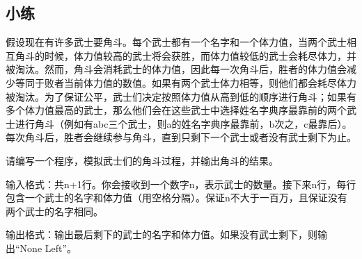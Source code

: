 \documentclass[../main.tex]{subfiles}
\begin{document}
\subsection{小练}

\begin{example}
  假设现在有许多武士要角斗。每个武士都有一个名字和一个体力值，当两个武士相互角斗的时候，体力值较高的武士将会获胜，而体力值较低的武士会耗尽体力，并被淘汰。然而，角斗会消耗武士的体力值，因此每一次角斗后，胜者的体力值会减少等同于败者当前体力值的数值。如果有两个武士体力相等，则他们都会耗尽体力被淘汰。为了保证公平，武士们决定按照体力值从高到低的顺序进行角斗；如果有多个体力值最高的武士，那么他们会在这些武士中选择姓名字典序最靠前的两个武士进行角斗（例如有abc三个武士，则a的姓名字典序最靠前，b次之，c最靠后）。每次角斗后，胜者会继续参与角斗，直到只剩下一个武士或者没有武士剩下为止。

  请编写一个程序，模拟武士们的角斗过程，并输出角斗的结果。

  输入格式：共n+1行。你会接收到一个数字n，表示武士的数量。接下来n行，每行包含一个武士的名字和体力值（用空格分隔）。保证n不大于一百万，且保证没有两个武士的名字相同。

  输出格式：输出最后剩下的武士的名字和体力值。如果没有武士剩下，则输出“None Left”。
\end{example}
\end{document}
